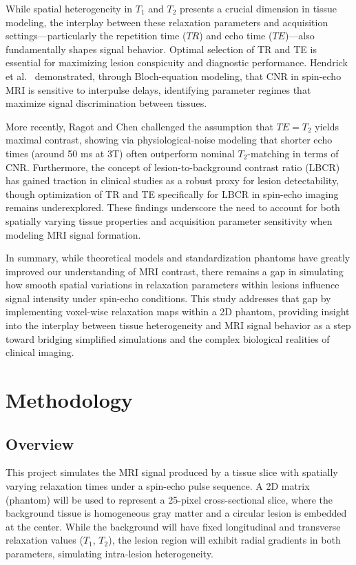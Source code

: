 \documentclass[10pt,a4paper,twoside]{article}
\begin{document}
While spatial heterogeneity in \( T_1 \) and \( T_2 \) presents a crucial dimension in tissue modeling, the interplay between these relaxation parameters and acquisition settings—particularly the repetition time (\( TR \)) and echo time (\( TE \))—also fundamentally shapes signal behavior. Optimal selection of TR and TE is essential for maximizing lesion conspicuity and diagnostic performance. Hendrick et al.\ \cite{hendrick1984} demonstrated, through Bloch-equation modeling, that CNR in spin-echo MRI is sensitive to interpulse delays, identifying parameter regimes that maximize signal discrimination between tissues. 

More recently, Ragot and Chen \cite{ragot2019} challenged the assumption that \( TE = T_2 \) yields maximal contrast, showing via physiological-noise modeling that shorter echo times (around 50 ms at 3T) often outperform nominal \( T_2 \)-matching in terms of CNR. Furthermore, the concept of lesion-to-background contrast ratio (LBCR) has gained traction in clinical studies as a robust proxy for lesion detectability, though optimization of TR and TE specifically for LBCR in spin-echo imaging remains underexplored. These findings underscore the need to account for both spatially varying tissue properties and acquisition parameter sensitivity when modeling MRI signal formation.

In summary, while theoretical models and standardization phantoms have greatly improved our understanding of MRI contrast, there remains a gap in simulating how smooth spatial variations in relaxation parameters within lesions influence signal intensity under spin-echo conditions. This study addresses that gap by implementing voxel-wise relaxation maps within a 2D phantom, providing insight into the interplay between tissue heterogeneity and MRI signal behavior as a step toward bridging simplified simulations and the complex biological realities of clinical imaging.

\section{Methodology}\label{sec:methods}

\subsection{Overview}

This project simulates the MRI signal produced by a tissue slice with spatially varying relaxation times under a spin-echo pulse sequence. A 2D matrix (phantom) will be used to represent a 25-pixel cross-sectional slice, where the background tissue is homogeneous gray matter and a circular lesion is embedded at the center. While the background will have fixed longitudinal and transverse relaxation values (\(T_1\), \(T_2\)), the lesion region will exhibit radial gradients in both parameters, simulating intra-lesion heterogeneity.
\end{document}
